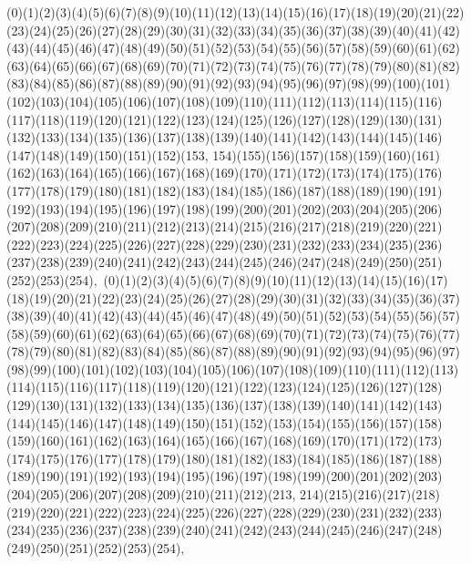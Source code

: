 \documentclass[12pt]{article}
\begin{document}
{(0)(1)(2)(3)(4)(5)(6)(7)(8)(9)(10)(11)(12)(13)(14)(15)(16)(17)(18)(19)(20)(21)(22)(23)(24)(25)(26)(27)(28)(29)(30)(31)(32)(33)(34)(35)(36)(37)(38)(39)(40)(41)(42)(43)(44)(45)(46)(47)(48)(49)(50)(51)(52)(53)(54)(55)(56)(57)(58)(59)(60)(61)(62)(63)(64)(65)(66)(67)(68)(69)(70)(71)(72)(73)(74)(75)(76)(77)(78)(79)(80)(81)(82)(83)(84)(85)(86)(87)(88)(89)(90)(91)(92)(93)(94)(95)(96)(97)(98)(99)(100)(101)(102)(103)(104)(105)(106)(107)(108)(109)(110)(111)(112)(113)(114)(115)(116)(117)(118)(119)(120)(121)(122)(123)(124)(125)(126)(127)(128)(129)(130)(131)(132)(133)(134)(135)(136)(137)(138)(139)(140)(141)(142)(143)(144)(145)(146)(147)(148)(149)(150)(151)(152)(153, 154)(155)(156)(157)(158)(159)(160)(161)(162)(163)(164)(165)(166)(167)(168)(169)(170)(171)(172)(173)(174)(175)(176)(177)(178)(179)(180)(181)(182)(183)(184)(185)(186)(187)(188)(189)(190)(191)(192)(193)(194)(195)(196)(197)(198)(199)(200)(201)(202)(203)(204)(205)(206)(207)(208)(209)(210)(211)(212)(213)(214)(215)(216)(217)(218)(219)(220)(221)(222)(223)(224)(225)(226)(227)(228)(229)(230)(231)(232)(233)(234)(235)(236)(237)(238)(239)(240)(241)(242)(243)(244)(245)(246)(247)(248)(249)(250)(251)(252)(253)(254)$
, 
$
(0)(1)(2)(3)(4)(5)(6)(7)(8)(9)(10)(11)(12)(13)(14)(15)(16)(17)(18)(19)(20)(21)(22)(23)(24)(25)(26)(27)(28)(29)(30)(31)(32)(33)(34)(35)(36)(37)(38)(39)(40)(41)(42)(43)(44)(45)(46)(47)(48)(49)(50)(51)(52)(53)(54)(55)(56)(57)(58)(59)(60)(61)(62)(63)(64)(65)(66)(67)(68)(69)(70)(71)(72)(73)(74)(75)(76)(77)(78)(79)(80)(81)(82)(83)(84)(85)(86)(87)(88)(89)(90)(91)(92)(93)(94)(95)(96)(97)(98)(99)(100)(101)(102)(103)(104)(105)(106)(107)(108)(109)(110)(111)(112)(113)(114)(115)(116)(117)(118)(119)(120)(121)(122)(123)(124)(125)(126)(127)(128)(129)(130)(131)(132)(133)(134)(135)(136)(137)(138)(139)(140)(141)(142)(143)(144)(145)(146)(147)(148)(149)(150)(151)(152)(153)(154)(155)(156)(157)(158)(159)(160)(161)(162)(163)(164)(165)(166)(167)(168)(169)(170)(171)(172)(173)(174)(175)(176)(177)(178)(179)(180)(181)(182)(183)(184)(185)(186)(187)(188)(189)(190)(191)(192)(193)(194)(195)(196)(197)(198)(199)(200)(201)(202)(203)(204)(205)(206)(207)(208)(209)(210)(211)(212)(213, 214)(215)(216)(217)(218)(219)(220)(221)(222)(223)(224)(225)(226)(227)(228)(229)(230)(231)(232)(233)(234)(235)(236)(237)(238)(239)(240)(241)(242)(243)(244)(245)(246)(247)(248)(249)(250)(251)(252)(253)(254)$
, 
$
}
\end{document}
